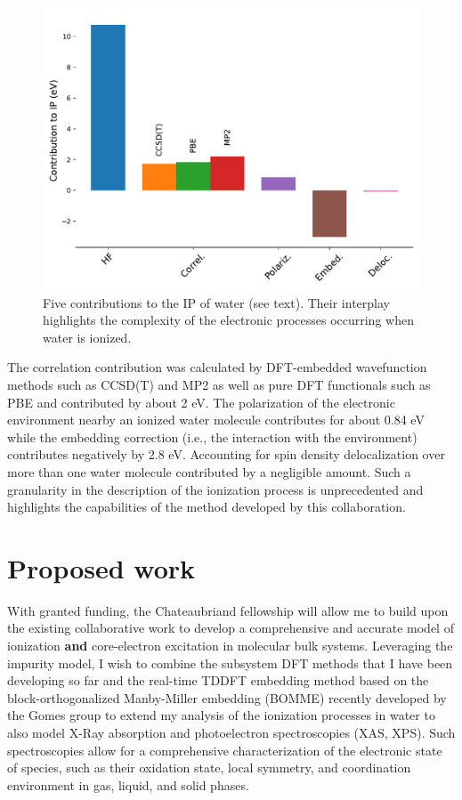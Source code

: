 \documentclass[notitlepage,12pt]{report}
\begin{document}
\begin{figure}
	\includegraphics[width=\linewidth]{./images/contribution_liquidwater_PI}
    \caption{\label{cont_ip}Five contributions to the IP of water (see text). Their interplay highlights the complexity of the electronic processes occurring when water is ionized. \supercite{}}
\end{figure}
    The correlation contribution was calculated by DFT-embedded wavefunction methods such as CCSD(T) and MP2 as well as pure DFT functionals such as PBE and contributed by about 2 eV. The polarization of the electronic environment nearby an ionized water molecule contributes for about 0.84 eV while the embedding correction (i.e., the interaction with the environment) contributes negatively by 2.8 eV. Accounting for spin density delocalization over more than one water molecule contributed by a negligible amount. Such a granularity in the description of the ionization process is unprecedented and highlights the capabilities of the method developed by this collaboration. 	
	
    \section{Proposed work}
    
    With granted funding, the Chateaubriand fellowship will allow me to build upon the existing collaborative work to develop a comprehensive and accurate model of ionization {\bf and } core-electron excitation in molecular bulk systems. Leveraging the impurity model, I wish to combine the subsystem DFT methods that I have been developing so far and the real-time TDDFT embedding method based on the  block-orthogonalized Manby-Miller embedding (BOMME) \supercite{ding2017embedded,koh2017accelerating} recently  developed by the Gomes group \supercite{De_Santis_2020,de2021environment} to extend my analysis of the ionization processes in water to also model X-Ray absorption and photoelectron spectroscopies (XAS, XPS)\supercite{fransson2016x}. Such spectroscopies  allow for a comprehensive characterization of the electronic state of species, such as their oxidation state, local symmetry, and coordination environment in gas, liquid, and solid phases\supercite{rehr2005progress,koningsberger1987x}. 
\end{document}
